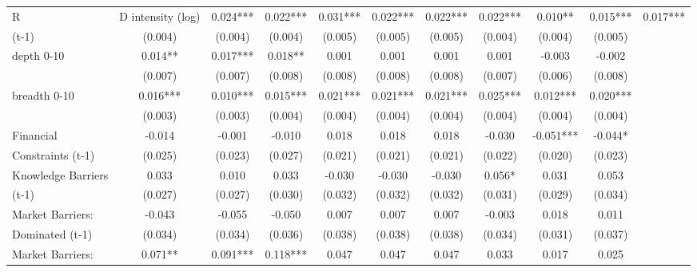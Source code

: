 \begin{table}[htbp]
\begin{tabular}{l*{9}{c}}
R&D intensity (log) &       0.024***&       0.022***&       0.031***&       0.022***&       0.022***&       0.022***&       0.010** &       0.015***&       0.017***\\
(t-1)               &     (0.004)   &     (0.004)   &     (0.004)   &     (0.005)   &     (0.005)   &     (0.005)   &     (0.004)   &     (0.004)   &     (0.005)   \\
depth 0-10          &       0.014** &       0.017***&       0.018** &       0.001   &       0.001   &       0.001   &       0.001   &      -0.003   &      -0.002   \\
                    &     (0.007)   &     (0.007)   &     (0.008)   &     (0.008)   &     (0.008)   &     (0.008)   &     (0.007)   &     (0.006)   &     (0.008)   \\
breadth 0-10        &       0.016***&       0.010***&       0.015***&       0.021***&       0.021***&       0.021***&       0.025***&       0.012***&       0.020***\\
                    &     (0.003)   &     (0.003)   &     (0.004)   &     (0.004)   &     (0.004)   &     (0.004)   &     (0.004)   &     (0.004)   &     (0.004)   \\
Financial           &      -0.014   &      -0.001   &      -0.010   &       0.018   &       0.018   &       0.018   &      -0.030   &      -0.051***&      -0.044*  \\
Constraints (t-1)   &     (0.025)   &     (0.023)   &     (0.027)   &     (0.021)   &     (0.021)   &     (0.021)   &     (0.022)   &     (0.020)   &     (0.023)   \\
Knowledge Barriers  &       0.033   &       0.010   &       0.033   &      -0.030   &      -0.030   &      -0.030   &       0.056*  &       0.031   &       0.053   \\
(t-1)               &     (0.027)   &     (0.027)   &     (0.030)   &     (0.032)   &     (0.032)   &     (0.032)   &     (0.031)   &     (0.029)   &     (0.034)   \\
Market Barriers:    &      -0.043   &      -0.055   &      -0.050   &       0.007   &       0.007   &       0.007   &      -0.003   &       0.018   &       0.011   \\
Dominated (t-1)     &     (0.034)   &     (0.034)   &     (0.036)   &     (0.038)   &     (0.038)   &     (0.038)   &     (0.034)   &     (0.031)   &     (0.037)   \\
Market Barriers:    &       0.071** &       0.091***&       0.118***&       0.047   &       0.047   &       0.047   &       0.033   &       0.017   &       0.025   \\

\end{tabular}
\end{table}
